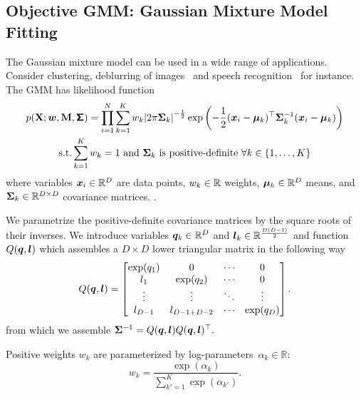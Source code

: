 \documentclass[suppldata]{article}
\begin{document}
\subsection{Objective GMM: Gaussian Mixture Model Fitting}
\label{sec:gmm}
The Gaussian mixture model can be used in a wide range of applications. Consider
clustering,
deblurring of images~\cite{Zoran11gmm}
and speech recognition~\cite{Yu14automatic}
for instance.
The GMM has likelihood function
\begin{equation}
\begin{gathered}
\begin{aligned}
p({\bf X};\bm{w},{\bf M},\bm{\mathsf \Sigma}) = \prod_{i=1}^{N}{ \sum_{k=1}^K{w_k {|2 \pi {\bf \Sigma}_k|}^{-\frac12}} \exp{\left(-\frac{1}{2} (\bm{x}_i-\bm{\mu}_k)^\top{\bf \Sigma}_k^{-1} (\bm{x}_i - \bm{\mu}_k)\right)}} \end{aligned}\\ 
\text{s.t.} \sum_{k=1}^K{w_k} = 1 \ \text{and} \ {\bf \Sigma}_k \ \text{is positive-definite} \ \forall k \in \{1,\dots,K\}
\end{gathered}
\label{eq:gmm1}
\end{equation}
where variables $\bm{x}_i \in {\mathbb R}^D$ are data points, $w_k \in {\mathbb R}$ weights, $\bm{\mu}_k \in {\mathbb R}^{D}$ means, and ${\bf \Sigma}_k \in {\mathbb R}^{D \times D}$ covariance matrices. . 

We  parametrize the positive-definite covariance matrices by the square roots of their inverses. We introduce variables $\bm{q}_k \in {\mathbb R}^D$ and $\bm{l}_k \in {\mathbb R}^{\frac{D(D-1)}{2}}$ and function $Q(\bm{q}, \bm{l})$ which assembles a $D \times D$ lower triangular matrix in the following way
\begin{equation}
Q(\bm{q}, \bm{l}) = \begin{bmatrix} \exp(q_1) & 0 & \cdots & 0 \\
                    l_1 & \exp(q_2) & \cdots & 0 \\
                    \vdots & \vdots & \ddots & \vdots\\
                    l_{D-1} & l_{D-1 + D-2} & \cdots & \exp(q_D) \end{bmatrix}.
\end{equation}
from which we assemble 
${\bf \Sigma}^{-1} = Q(\bm{q},\bm{l}) Q(\bm{q},\bm{l})^\top.$

\noindent 
Positive weights $w_k$ are parameterized by log-parameters~$\alpha_k \in \mathbb R$:
\begin{equation}
w_k = \frac{\exp(\alpha_k)}{\sum_{k'=1}^K{\exp(\alpha_{k'})}}.
\end{equation}
\end{document}

